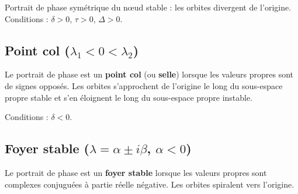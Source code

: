 \begin{definition}[N\oe ud instable]
Portrait de phase sym\'etrique du n\oe ud stable : les orbites divergent
de l'origine. Conditions : $\delta > 0$, $\tau > 0$, $\Delta > 0$.
\end{definition}

\subsection{Point col ($\lambda_1 < 0 < \lambda_2$)}

\begin{definition}
Le portrait de phase est un \textbf{point col} (ou \textbf{selle}) lorsque
les valeurs propres sont de signes oppos\'es. Les orbites s'approchent de
l'origine le long du sous-espace propre stable et s'en \'eloignent le long
du sous-espace propre instable.
\end{definition}

Conditions : $\delta < 0$.

\begin{center}
\end{center}

\subsection{Foyer stable ($\lambda = \alpha \pm i\beta$, $\alpha < 0$)}

\begin{definition}
Le portrait de phase est un \textbf{foyer stable} lorsque les valeurs propres
sont complexes conjugu\'ees \`a partie r\'eelle n\'egative. Les orbites
spiralent vers l'origine.
\end{definition}

